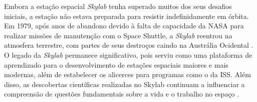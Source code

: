 Embora a estação espacial \emph{Skylab} tenha superado muitos dos seus desafios iniciais, a estação não estava preparada para resistir indefinidamente em órbita.
Em 1979, após anos de abandono devido à falta de capacidade da NASA para realizar missões de manutenção com o Space Shuttle, a \emph{Skylab} reentrou na atmosfera terrestre, com partes de seus destroços caindo na Austrália Ocidental \cite{nasaSkylabReentry}.
O legado da \emph{Skylab} permanece significativo, pois serviu como uma plataforma de aprendizado para o desenvolvimento de estações espaciais maiores e mais modernas, além de estabelecer os alicerces para programas como o da ISS. 
Além disso, as descobertas científicas realizadas no Skylab continuam a influenciar a compreensão de questões fundamentais sobre a vida e o trabalho no espaço \cite{nasaSkylab}.





